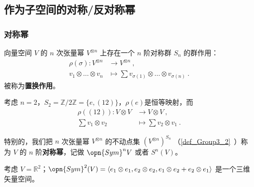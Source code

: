 
\begin{issues}
\issueTODO
{}
\end{issues}


\subsection{作为子空间的对称/反对称幂}

\subsubsection{对称幂}

向量空间 $V$ 的 $n$ 次张量幂 $V^{\otimes n}$ 上存在一个 $n$ 阶对称群 $S_n$ 的群作用：
\begin{equation}
\begin{aligned}
\rho(\sigma): V^{\otimes n} &\to V^{\otimes n}~, \\
v_1 \otimes \dots \otimes v_n &\mapsto \sum v_{\sigma(1)} \otimes \dots \otimes v_{\sigma(n)}~.
\end{aligned}
\end{equation}
被称为\textbf{置换作用}。

\begin{example}{}
考虑 $n = 2$，$S_2 = \mathbb{Z}/2\mathbb{Z} = \{e, (1 2)\}$，$\rho(e)$是恒等映射，而
\begin{equation}
\begin{aligned}
\rho((1 2)): V \otimes V &\to V \otimes V~, \\
\sum v_1 \otimes v_2 &\mapsto \sum v_2 \otimes v_1~.
\end{aligned}
\end{equation}
\end{example}

特别的，我们把 $n$ 次张量幂 $V^{\otimes n}$ 的不动点集 $(V^{\otimes n})^{S_n}$ （\autoref{def_Group3_2}~）称为 $V$ 的 $n$ 阶\textbf{对称幂}，记做 $\opn{Sym}^n V$ 或者 $S^n(V)$。

\begin{example}{}\label{ex_vecSAS_1}
考虑 $V = \mathbb{R}^2$；$\opn{Sym}^2(V) = \langle e_1 \otimes e_1, e_2 \otimes e_2, e_1 \otimes e_2 + e_2 \otimes e_1 \rangle$ 是一个三维矢量空间。
\end{example}

